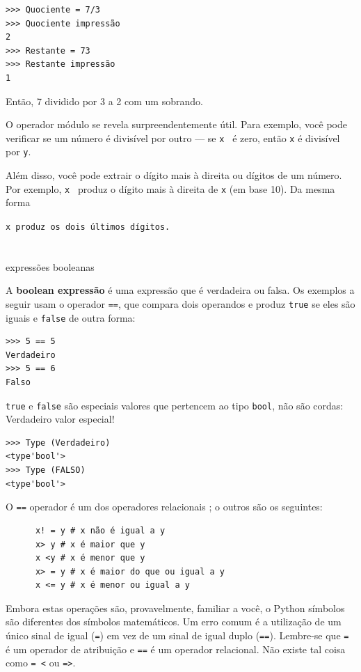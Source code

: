 \documentclass[10pt]{book}
\begin{document}
\begin{exercise}
\begin{verbatim}
>>> Quociente = 7/3
>>> Quociente impressão
2
>>> Restante = 73
>>> Restante impressão
1
\end{verbatim}
%
Então, 7 dividido por 3 a 2 com um sobrando.

O operador módulo se revela surpreendentemente útil. Para
exemplo, você pode verificar se um número é divisível por outro --- se
{\tt x \y} é zero, então {\tt x} é divisível por {\tt y}.

Além disso, você pode extrair o dígito mais à direita
ou dígitos de um número. Por exemplo, {\tt x } produz o
dígito mais à direita de {\tt x} (em base 10). Da mesma forma {\tt x %
produz os dois últimos dígitos.


\section{} expressões booleanas

A {\bf boolean expressão} é uma expressão que é verdadeira
ou falsa. Os exemplos a seguir usam o
operador {\tt ==}, que compara dois operandos e produz
{\tt true} se eles são iguais e {\tt false} de outra forma:

\begin{verbatim}
>>> 5 == 5
Verdadeiro
>>> 5 == 6
Falso
\end{verbatim}
%
{\tt true} e {\tt false} são especiais
valores que pertencem ao tipo {\tt bool}, não são cordas:
{Verdadeiro valor especial!} \Index
{}

\begin{verbatim}
>>> Type (Verdadeiro)
<type'bool'>
>>> Type (FALSO)
<type'bool'>
\end{verbatim}
%
O {\tt ==} operador é um dos operadores relacionais {\bf}; o
outros são os seguintes:

\begin{verbatim}
      x! = y # x não é igual a y
      x> y # x é maior que y
      x <y # x é menor que y
      x> = y # x é maior do que ou igual a y
      x <= y # x é menor ou igual a y
\end{verbatim}
%
Embora estas operações são, provavelmente, familiar a você, o Python
símbolos são diferentes dos símbolos matemáticos. Um erro comum
é a utilização de um único sinal de igual ({\tt =}) em vez de um sinal de igual duplo
({\tt ==}). Lembre-se que {\tt =} é um operador de atribuição e
{\tt ==} é um operador relacional. Não existe tal coisa como
{\tt = <} ou {\tt =>}.


}
\end{exercise}
\end{document}
